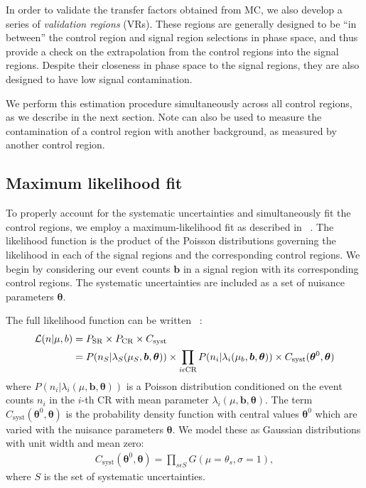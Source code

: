In order to validate the transfer factors obtained from MC, we also develop a series of \textit{validation regions} (VRs).
These regions are generally designed to be ``in between'' the control region and signal region selections in phase space, and thus provide a check on the extrapolation from the control regions into the signal regions.
Despite their closeness in phase space to the signal regions, they are also designed to have low signal contamination.

We perform this estimation procedure simultaneously across all control regions, as we describe in the next section.
Note  can also be used to measure the contamination of a control region with another background, as measured by another control region.

\subsection{Maximum likelihood fit}

To properly account for the systematic uncertainties and simultaneously fit the control regions, we employ a maximum-likelihood fit as described in ~\cite{Baak:2014wma}.
The likelihood function \Lagr is the product of the Poisson distributions governing the likelihood in each of the signal regions and the corresponding control regions.
We begin by considering our event counts  $\bm{b}$ in a signal region with its corresponding control regions.
The systematic uncertainties are included as a set of nuisance parameters $\bm{\theta}$.

The full likelihood function can be written ~\cite{Baak:2014wma}:
\begin{align}
\mathcal{L}(n | \mu, b) &= P_{\mathrm{SR}} \times P_{\mathrm{CR}} \times C_{\mathrm{syst}} \\
                  &= P(n_S | \lambda_S(\mu_{S},  \bm{b}, \bm{\theta} ) ) \times
                     \prod_{i \epsilon \text{CR}}  P(n_i | \lambda_i(\mu_b , \bm{b}, \bm{\theta}))
                     \times C_{\text{syst}}(\bm{\theta}^0 , \bm{\theta})
\end{align}
where $P(n_i | \lambda_i(\mu , \bm{b}, \bm{\theta}))$ is a Poisson distribution conditioned on the event counts $n_i$ in the $i$-th CR with mean parameter $\lambda_i(\mu , \bm{b}, \bm{\theta})$.
The term $C_{\text{syst}}(\bm{\theta}^0 , \bm{\theta})$ is the probability density function with central values $\bm{\theta}^0$ which are varied with the nuisance parameters $\bm{\theta}$.
We model these as Gaussian distributions with unit width and mean zero:
\begin{align}
C_{\text{syst}}(\bm{\theta}^0 , \bm{\theta}) = \prod_{s\epsilon S} G(\mu = \theta_s, \sigma = 1),
\end{align}
where $S$ is the set of systematic uncertainties.

